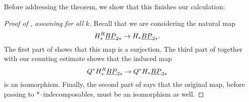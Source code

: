 \noindent Before addressing the theorem, we show that this finishes our calculation:
\begin{proof}[{Proof of , assuming  for all $k$}]
Recall that we are considering the natural map \[H_*^R \underline{\smash{BP}}_{2*} \to H_* \underline{\smash{BP}}_{2*}.\]  The first part of  shows that this map is a surjection.  The third part of  together with our counting estimate shows that the induced map \[Q^* H_*^R \underline{\smash{BP}}_{2*} \to Q^* H_* \underline{\smash{BP}}_{2*}\] is an isomorphism.  Finally, the second part of  says that the original map, before passing to $\ast$--indecomposables, must be an isomorphism as well.
\end{proof}

